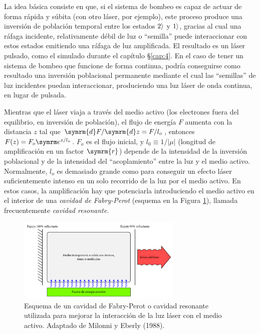 La idea básica consiste en que, si el sistema de bombeo es capaz de actuar de forma rápida y súbita (con otro láser, por ejemplo), este proceso produce una inversión de población temporal entre los estados $2\rangle$ y $1\rangle$, gracias al cual una ráfaga incidente, relativamente débil de luz o \enquote{semilla} puede interaccionar con estos estados emitiendo una ráfaga de luz amplificada. El resultado es un láser pulsado, como el simulado durante el capítulo \S\ref{cap:4}. En el caso de tener un sistema de bombeo que funcione de forma continua, podría conseguirse como resultado una inversión poblacional permanente mediante el cual las \enquote{semillas} de luz incidentes puedan interaccionar, produciendo una luz láser de onda continua, en lugar de pulsada.

Mientras que el láser viaja a través del medio activo (los electrones fuera del equilibrio, en inversión de población), el flujo de energía $F$ aumenta con la distancia $z$ tal que $\symrm{d}F/\symrm{d}z = F/l_{o}$, entonces $F(z) = F_{o}\eu^{z/l_{o}}$. $F_{o}$ es el flujo inicial, y $l_{0} \equiv 1/|\mu|$ (longitud de amplificación en un factor $\symrm{r}$) depende de la intensidad de la inversión poblacional y de la intensidad del \enquote{acoplamiento} entre la luz y el medio activo. Normalmente, $l_{o}$ es demasiado grande como para conseguir un efecto láser suficientemente intenso en un solo recorrido de la luz por el medio activo. En estos casos, la amplificación hay que potenciarla introduciendo el medio activo en el interior de una \emph{cavidad de Fabry-Perot} (esquema en la Figura \ref{fig:1.4}), llamada frecuentemente \emph{cavidad resonante}.

\begin{figure}[htbp]
  \centering
  \includegraphics[width=0.7\textwidth]{Figuras/ch1_cavidad.pdf}
  \caption{Esquema de un cavidad de Fabry-Perot o cavidad resonante utilizada para mejorar la interacción de la luz láser con el medio activo. Adaptado de Milonni y Eberly (1988)\autocite{Milonni1988}.}
  \label{fig:1.4}
\end{figure}

